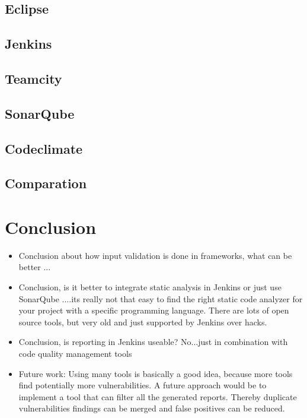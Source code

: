 \documentclass[conference]{IEEEtran}
\begin{document}
\subsection{Eclipse}
\label{subsec:evaluation_eclipse}

\subsection{Jenkins}
\label{subsec:evaluation_jenkins}

\subsection{Teamcity}
\label{subsec:evaluation_teamcity}

\subsection{SonarQube}
\label{subsec:evaluation_sonarqube}

\subsection{Codeclimate}
\label{subsec:evaluation_codeclimate}


\subsection{Comparation}
\label{subsec:comparation}



\section{Conclusion}
\label{sec:conclusion}
\begin{itemize}
	\item Conclusion about how input validation is done in frameworks, what can be better ...
	\item Conclusion, is it better to integrate static analysis in Jenkins or just use SonarQube
	....its really not that easy to find the right static code analyzer for your project with a specific programming language. There are lots of open source tools, but very old and just supported by Jenkins over hacks.
	\item Conclusion, is reporting in Jenkins useable? No...just in combination with code quality management tools
	\item Future work: Using many tools is basically a good idea, because more tools find potentially more vulnerabilities. A future approach would be to implement a tool that can filter all the generated reports. Thereby duplicate vulnerabilities findings can be merged and false positives can be reduced.
\end{itemize}
\end{document}
